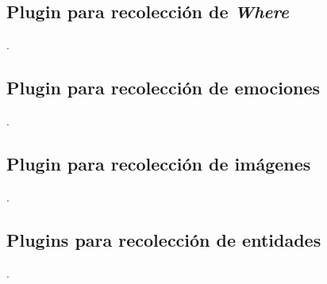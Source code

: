 \subsection{Plugin para recolección de \textit{Where}}
.

\subsection{Plugin para recolección de emociones}
.


\subsection{Plugin para recolección de imágenes}
.

\subsection{Plugins para recolección de entidades}
.


